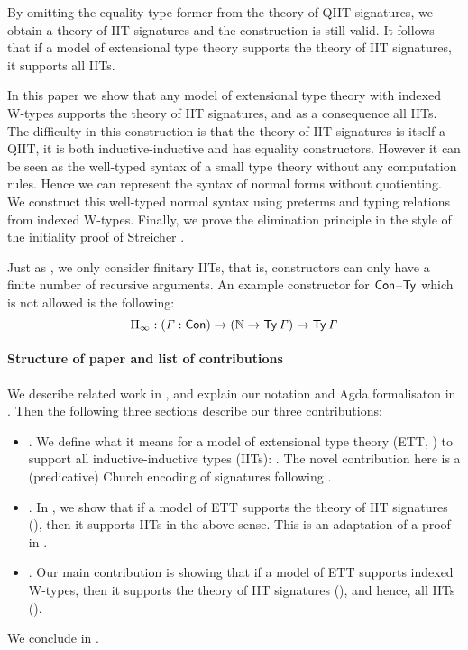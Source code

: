 \documentclass[a4paper,UKenglish,cleveref, autoref]{lipics-v2019}
\begin{document}
By omitting the equality type former from the theory of QIIT
signatures, we obtain a theory of IIT signatures and the construction
is still valid. It follows that if a model of extensional type theory
supports the theory of IIT signatures, it supports all IITs.

In this paper we show that any model of extensional type theory with
indexed W-types supports the theory of IIT signatures, and as a
consequence all IITs. The difficulty in this construction is that the
theory of IIT signatures is itself a QIIT, it is both
inductive-inductive and has equality constructors. However it can be
seen as the well-typed syntax of a small type theory without any
computation rules. Hence we can represent the syntax of normal forms
without quotienting. We construct this well-typed normal syntax using
preterms and typing relations from indexed W-types. Finally, we prove
the elimination principle in the style of the initiality proof of
Streicher \cite{streichersemantics}.

Just as \cite{Kaposi:2019:CQI:3302515.3290315}, we only consider
finitary IITs, that is, constructors can only have a finite number of
recursive arguments. An example constructor for $\mathsf{Con}$--$\mathsf{Ty}$ which is
not allowed is the following:
\[
  \Pi_\infty : (\mathit{\Gamma} : \mathsf{Con}) \rightarrow (\mathbb{N} \rightarrow \mathsf{Ty}\,\mathit{\Gamma}) \rightarrow \mathsf{Ty}\,\mathit{\Gamma}
\]

\paragraph*{Structure of paper and list of contributions}

We describe related work in , and explain our
notation and Agda formalisaton in . Then the
following three sections describe our three contributions:
\begin{itemize}
\item {}. We define what it means for a
  model of extensional type theory (ETT, ) to support
  all inductive-inductive types (IITs): . The novel
  contribution here is a (predicative) Church encoding of signatures
  following \cite{DBLP:conf/lics/AwodeyFS18}.
\item {}. In , we show that if a
  model of ETT supports the theory of IIT signatures
  (), then it supports IITs in the above
  sense. This is an adaptation of a proof in
  \cite{Kaposi:2019:CQI:3302515.3290315}.
\item {}. Our main contribution is showing that if a
  model of ETT supports indexed W-types, then it supports the theory
  of IIT signatures (), and hence, all IITs ().
\end{itemize}
We conclude in .
\end{document}
